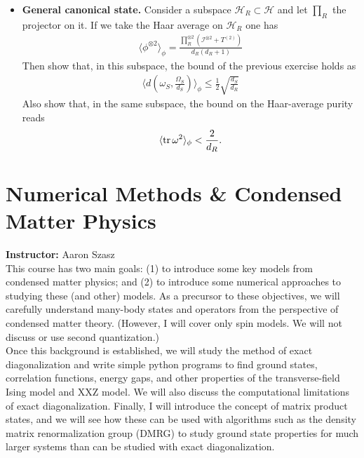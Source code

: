 \documentclass{book}
\theoremstyle{definition}
\newcommand{\had}{\mathcal{H}}
\newcommand{\f}[2]{\frac{#1}{#2}}
\newcommand{\lp}{\left(}
\newcommand{\rp}{\right)}
\newcommand{\la}{\langle}
\newcommand{\ra}{\rangle}
\newcommand{\Id}{\mathcal{I}}
\begin{document}
\begin{itemize}
	\begin{proof}
		to be continued... 
	\end{proof}



	\item \textbf{General canonical state.} Consider a subspace $\had_R \subset \had$ and let $\prod_R$ the projector on it. If we take the Haar average on $\had_R$ one has
	\begin{align}
	\la \phi^{\otimes 2}\ra_\phi = \f{\prod_R^{\otimes 2} (\Id^{\otimes 2} + T^{(2)})}{d_R (d_R+1)}
	\end{align}
	Then show that, in this subspace, the bound of the previous exercise holds as
	\begin{align}
	\langle d\lp \omega_S, \f{\Omega_S}{d_S} \rp \rangle_\phi \leq \f{1}{2}\sqrt{\f{d_S}{d_R}}
	\end{align}
	Also show that, in the same subspace, the bound on the Haar-average purity reads
	\begin{align}
	\la \tr \omega^2 \ra_\phi < \f{2}{d_R}.
	\end{align}
\end{itemize}






    










\newpage
\chapter{Numerical Methods \& Condensed Matter Physics}

\textbf{Instructor:} Aaron Szasz\\

This course has two main goals: (1) to introduce some key models from condensed matter physics; and (2) to introduce some numerical approaches to studying these (and other) models.  As a precursor to these objectives, we will carefully understand many-body states and operators from the perspective of condensed matter theory.  (However, I will cover only spin models.  We will not discuss or use second quantization.)\\



Once this background is established, we will study the method of exact diagonalization and write simple python programs to find ground states, correlation functions, energy gaps, and other properties of the transverse-field Ising model and XXZ model.  We will also discuss the computational limitations of exact diagonalization.  Finally, I will introduce the concept of matrix product states, and we will see how these can be used with algorithms such as the density matrix renormalization group (DMRG) to study ground state properties for much larger systems than can be studied with exact diagonalization.
\end{document}
